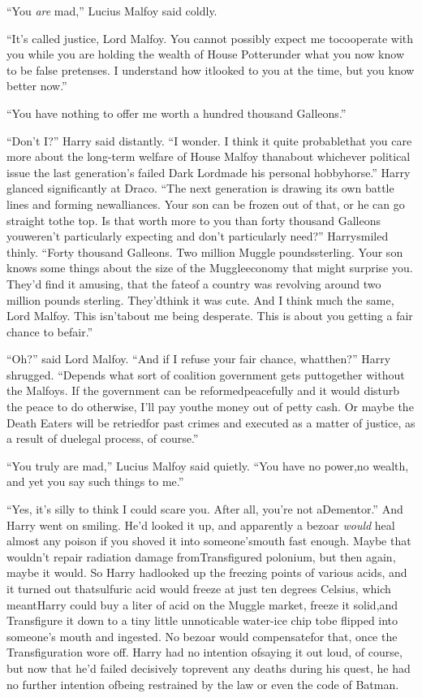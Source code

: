 ``You \emph{are} mad,'' Lucius Malfoy said coldly.

``It's called justice, Lord Malfoy. You cannot possibly expect me tocooperate with you while you are holding the wealth of House Potterunder what you now know to be false pretenses. I understand how itlooked to you at the time, but you know better now.''

``You have nothing to offer me worth a hundred thousand Galleons.''

``Don't I?'' Harry said distantly. ``I wonder. I think it quite probablethat you care more about the long-term welfare of House Malfoy thanabout whichever political issue the last generation's failed Dark Lordmade his personal hobbyhorse.'' Harry glanced significantly at Draco.
``The next generation is drawing its own battle lines and forming newalliances. Your son can be frozen out of that, or he can go straight tothe top. Is that worth more to you than forty thousand Galleons youweren't particularly expecting and don't particularly need?'' Harrysmiled thinly. ``Forty thousand Galleons. Two million Muggle poundssterling. Your son knows some things about the size of the Muggleeconomy that might surprise you. They'd find it amusing, that the fateof a country was revolving around two million pounds sterling. They'dthink it was cute. And I think much the same, Lord Malfoy. This isn'tabout me being desperate. This is about you getting a fair chance to befair.''

``Oh?'' said Lord Malfoy. ``And if I refuse your fair chance, whatthen?''
Harry shrugged. ``Depends what sort of coalition government gets puttogether without the Malfoys. If the government can be reformedpeacefully and it would disturb the peace to do otherwise, I'll pay youthe money out of petty cash. Or maybe the Death Eaters will be retriedfor past crimes and executed as a matter of justice, as a result of duelegal process, of course.''

``You truly are mad,'' Lucius Malfoy said quietly. ``You have no power,no wealth, and yet you say such things to me.''

``Yes, it's silly to think I could scare you. After all, you're not aDementor.''
And Harry went on smiling. He'd looked it up, and apparently a bezoar
\emph{would} heal almost any poison if you shoved it into someone'smouth fast enough. Maybe that wouldn't repair radiation damage fromTransfigured polonium, but then again, maybe it would. So Harry hadlooked up the freezing points of various acids, and it turned out thatsulfuric acid would freeze at just ten degrees Celsius, which meantHarry could buy a liter of acid on the Muggle market, freeze it solid,and Transfigure it down to a tiny little unnoticable water-ice chip tobe flipped into someone's mouth and ingested. No bezoar would compensatefor that, once the Transfiguration wore off. Harry had no intention ofsaying it out loud, of course, but now that he'd failed decisively toprevent any deaths during his quest, he had no further intention ofbeing restrained by the law or even the code of Batman.

